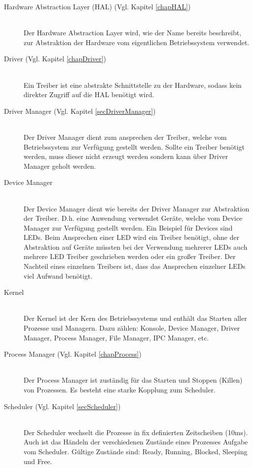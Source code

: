 \begin{description}
	\item[Hardware Abstraction Layer (HAL) (Vgl. Kapitel \ref{chapHAL})] \hfill \\
	Der Hardware Abstraction Layer wird, wie der Name bereits beschreibt, zur Abstraktion der Hardware vom eigentlichen Betriebssystem verwendet.
	
	\item[Driver (Vgl. Kapitel \ref{chapDriver})] \hfill \\
	Ein Treiber ist eine abstrakte Schnittstelle zu der Hardware, sodass kein direkter Zugriff auf die HAL benötigt wird.
	
	\item[Driver Manager (Vgl. Kapitel \ref{secDriverManager})] \hfill \\
	Der Driver Manager dient zum ansprechen der Treiber, welche vom Betriebssystem zur Verfügung gestellt werden. Sollte ein Treiber benötigt werden, muss dieser nicht erzeugt werden sondern kann über Driver Manager geholt werden. 
	
	\item[Device Manager] \hfill \\
	Der Device Manager dient wie bereits der Driver Manager zur Abstraktion der Treiber. D.h. eine Anwendung verwendet Geräte, welche vom Device Manager zur Verfügung gestellt werden. Ein Beispiel für Devices sind LEDs. Beim Ansprechen einer LED wird ein Treiber benötigt, ohne der Abstraktion auf Geräte müssten bei der Verwendung mehrerer LEDs auch mehrere LED Treiber geschrieben werden oder ein großer Treiber. Der Nachteil eines einzelnen Treibers ist, dass das Ansprechen einzelner LEDs viel Aufwand benötigt.
	
	\item[Kernel] \hfill \\
	Der Kernel ist der Kern des Betriebssystems und enthält das Starten aller Prozesse und Managern. Dazu zählen: Konsole, Device Manager, Driver Manager, Process Manager, File Manager, IPC Manager, etc.
	
	\item[Process Manager (Vgl. Kapitel \ref{chapProcess})] \hfill \\
	Der Process Manager ist zuständig für das Starten und Stoppen (Killen) von Prozessen. Es besteht eine starke Kopplung zum Scheduler.
	
	\item[Scheduler (Vgl. Kapitel \ref{secScheduler})] \hfill \\
	Der Scheduler wechselt die Prozesse in fix definierten Zeitscheiben (10ms). Auch ist das Händeln der verschiedenen Zustände eines Prozesses Aufgabe vom Scheduler. Gültige Zustände sind: Ready, Running, Blocked, Sleeping und Free.
	

\end{description}
